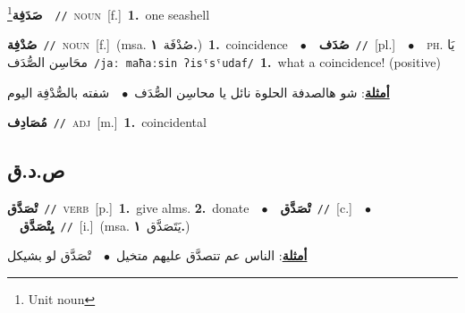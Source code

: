 \documentclass[10pt,a4paper,twoside]{article} %
\begin{document}
\begin{multicols}{2}
{\setlength\topsep{0pt}\textbf{\foreignlanguage{arabic}{صَدَفِة}}\footnote{Unit noun}\ \ {\color{gray}\texttt{//}\color{black}}\ \textsc{noun}\ [f.]\ \textbf{1.}~one seashell\ } \vspace{2mm}

{\setlength\topsep{0pt}\textbf{\foreignlanguage{arabic}{صُدْفِة}}\ {\color{gray}\texttt{//}\color{black}}\ \textsc{noun}\ [f.]\ \color{gray}(msa. \foreignlanguage{arabic}{صُدْفَة}~\foreignlanguage{arabic}{\textbf{١.}})\color{black}\ \textbf{1.}~coincidence\ \ $\bullet$\ \ \setlength\topsep{0pt}\textbf{\foreignlanguage{arabic}{صُدَف}}\ {\color{gray}\texttt{//}\color{black}}\ [pl.]\ \ $\bullet$\ \ \textsc{ph.} \color{gray} \foreignlanguage{arabic}{يَا محَاسِن الصُّدَف}\color{black}\ {\color{gray}\texttt{/{\sffamily jaː maħaːsin ʔisˤsˤudaf}/}\color{black}}\ \textbf{1.}~what a coincidence! (positive)\  \begin{flushright}\color{gray}\foreignlanguage{arabic}{\textbf{\underline{\foreignlanguage{arabic}{أمثلة}}}: شو هالصدفة الحلوة نائل يا محاسِن الصُّدَف\ $\bullet$\ \  شفته بالصُّدْفِة اليوم}\end{flushright}\color{black}} \vspace{2mm}

{\setlength\topsep{0pt}\textbf{\foreignlanguage{arabic}{مُصَادِف}}\ {\color{gray}\texttt{//}\color{black}}\ \textsc{adj}\ [m.]\ \textbf{1.}~coincidental\ } \vspace{2mm}

\vspace{-3mm}
\subsection*{\color{blue}\foreignlanguage{arabic}{ص.د.ق}\color{blue}{}} 

{\setlength\topsep{0pt}\textbf{\foreignlanguage{arabic}{تْصَدَّق}}\ {\color{gray}\texttt{//}\color{black}}\ \textsc{verb}\ [p.]\ \textbf{1.}~give alms.  \textbf{2.}~donate\ \ $\bullet$\ \ \setlength\topsep{0pt}\textbf{\foreignlanguage{arabic}{تْصَدَّق}}\ {\color{gray}\texttt{//}\color{black}}\ [c.]\ \ $\bullet$\ \ \setlength\topsep{0pt}\textbf{\foreignlanguage{arabic}{يِتْصَدَّق}}\ {\color{gray}\texttt{//}\color{black}}\ [i.]\ \color{gray}(msa. \foreignlanguage{arabic}{يَتَصَدَّق}~\foreignlanguage{arabic}{\textbf{١.}})\color{black}\  \begin{flushright}\color{gray}\foreignlanguage{arabic}{\textbf{\underline{\foreignlanguage{arabic}{أمثلة}}}: الناس عم تتصدَّق عليهم متخيل\ $\bullet$\ \  تْصَدَّق لو بشيكل}\end{flushright}\color{black}} \vspace{2mm}


\end{multicols}
\end{document}
